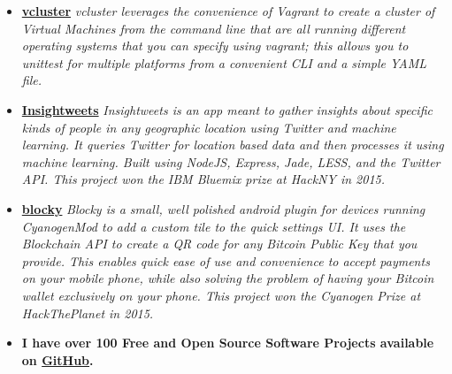 \documentclass[12pt,a4paper,sans]{moderncv}
\begin{document}
\begin{itemize}

\item{\textbf{\href{https://github.com/davidawad/vcluster}{vcluster}}\textit{ vcluster leverages the convenience of Vagrant to create a cluster of Virtual Machines from the command line that are all running different operating systems that you can specify using vagrant; this allows you to unittest for multiple platforms from a convenient CLI and a simple YAML file.}}
\vspace{5pt}

\iffalse 
\item{\textbf{\href{http://github.com/davidawad/Quantum-Simulator}{Quantum Simulator}} \textit{ I currently maintain a quantum computation simulator written in python to replicate the effects of quantum logical gates on quantum bits in order to asses changes in amplitudes and experiment on quantum algorithms.}}
\vspace{5pt}
\fi

\item{\textbf{\href{http://insightweets.mybluemix.net/landing}{Insightweets}}\textit{ Insightweets is an app meant to gather insights about specific kinds of people in any geographic location using Twitter and machine learning. It queries Twitter for location based data and then processes it using machine learning. Built using NodeJS, Express, Jade, LESS, and the Twitter API. This project won the IBM Bluemix prize at HackNY in 2015.}}
\vspace{5pt}

\item{\textbf{\href{http://github.com/davidawad/blocky}{blocky}} \textit{ Blocky is a small, well polished android plugin for devices running CyanogenMod to add a custom tile to the quick settings UI. It uses the Blockchain API to create a QR code for any Bitcoin Public Key that you provide. This enables quick ease of use and convenience to accept payments on your mobile phone, while also solving the problem of having your Bitcoin wallet exclusively on your phone. This project won the Cyanogen Prize at HackThePlanet in 2015.}}

\vspace{5pt}

\item{\textbf{I have over 100 Free and Open Source Software Projects available on \href{https://github.com/davidawad}{GitHub}.}}

\end{itemize}
\end{document}
